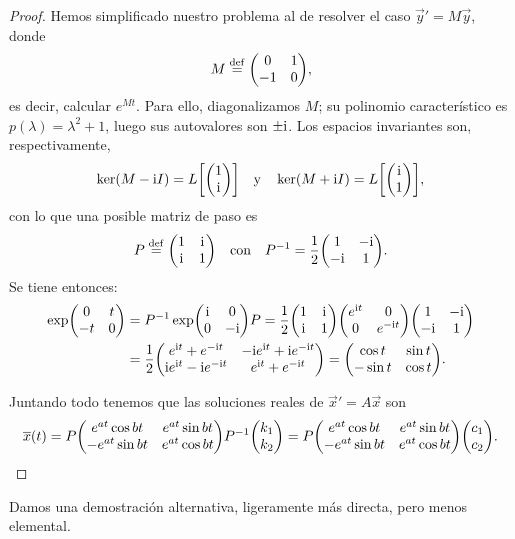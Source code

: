 \documentclass[../ecuaciones_diferenciales.tex]{subfiles}
\begin{document}
\begin{proof}
	Hemos simplificado nuestro problema al de resolver el caso 
	\(\vec{y}' = M\vec{y}\), donde
	\[M \assign \mat{0 & 1 \\ -1 & 0},\]
	es decir, calcular \(e^{Mt}\).
	Para ello, diagonalizamos \(M\); su polinomio característico es 
	\(p(\lambda) = \lambda^2 + 1\), luego sus
	autovalores son \(\pm \mathrm{i}\). Los espacios invariantes son, respectivamente,
	\[\ker(M - \iu I) = L\left[\mat{1 \\ \iu}\right] 
		\quad \text{y} \quad 
		\ker(M + \iu I) = L\left[\mat{\iu \\ 1}\right],\]
	con lo que una posible matriz de paso es 
	\[P \assign \mat{1 & \iu \\ \iu & 1} \quad \text{con} \quad 
		P^{-1} = \frac{1}{2} \mat{1 & -\iu \\ -\iu & 1}.\]
	Se tiene entonces:
	\begin{align*}
		\exp \mat{0 & t \\ -t & 0} &= P^{-1} \exp\mat{\iu & 0 \\ 0 & -\iu} P =
		\frac{1}{2} \mat{1 & \iu \\ \iu & 1}
		\mat{e^{\iu t} & 0 \\ 0 & e^{-\iu t}} \mat {1 & -\iu \\ -\iu & 1} \\
		&= \frac{1}{2} 
		\mat{e^{\iu t} + e^{-\iu t} & -\iu e^{\iu t} + \iu e^{-\iu t} \\
		\iu e^{\iu t} - \iu e^{-\iu t} & e^{\iu t} + e^{-\iu t}} 
		= \mat{\cos t & \sin t \\ -\sin t & \cos t}.
	\end{align*}

	Juntando todo tenemos que las soluciones reales de \(\vec{x}' = A\vec{x}\) 
	son
	\[\vec{x}(t) = P 
		\mat{e^{at}\cos bt & e^{at}\sin bt \\
			-e^{at} \sin bt & e^{at} \cos bt} P^{-1} 
		\mat{k_1 \\ k_2} 
		= P \mat{e^{at}\cos bt & e^{at}\sin bt \\
			-e^{at} \sin bt & e^{at} \cos bt} \mat {c_1 \\ c_2}.\]
\end{proof}

Damos una demostración alternativa, ligeramente más directa, pero menos 
elemental.
\end{document}
